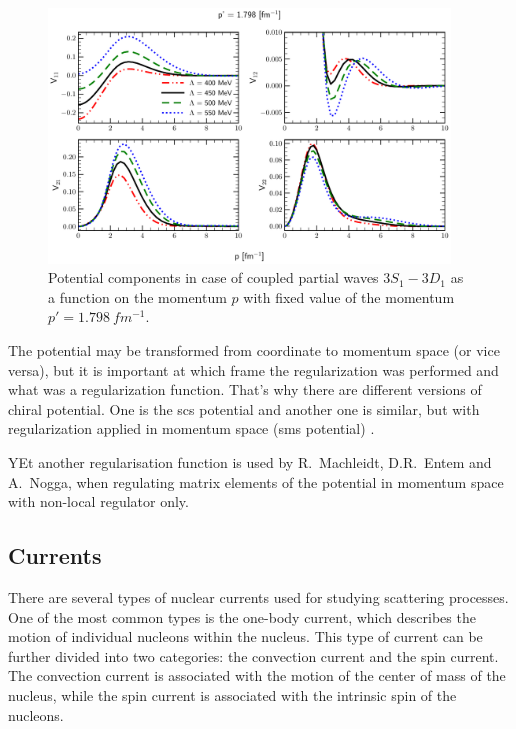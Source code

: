 \begin{figure}[htb]
    \begin{center}
    \includegraphics[width=0.95\textwidth]{PlotData/Deuteron/WAVEFUNC/potential_pp1.798.pdf}
    \end{center}
    \caption{Potential components in case of coupled partial waves $3S_1 - 3D_1$ as a function on the momentum $p$ with fixed
    value of the momentum $p'=\SI{1.798}{fm^{-1}}$.
    }
    \label{potential_cutoff}
\end{figure}



The potential may be transformed from coordinate to momentum space (or vice versa),
but it is important at which frame the regularization was performed
and what was a regularization function. That's why there are different 
versions of chiral potential. One is the \gls{scs} potential \cite{Epelbaum2014SCS}
and another one is similar, but with regularization applied in momentum space (\gls{sms} potential) \cite{reinkrebs2018}.

YEt another regularisation function  is used by R.~Machleidt, D.R.~Entem and A.~Nogga, 
when regulating matrix elements of the potential in momentum space with non-local regulator only.

\subsection*{Currents}
 
There are several types of nuclear currents used for studying scattering processes. One of the most common types is the one-body current, which describes the motion of individual nucleons within the nucleus. This type of current can be further divided into two categories: the convection current and the spin current. The convection current is associated with the motion of the center of mass of the nucleus, while the spin current is associated with the intrinsic spin of the nucleons.

